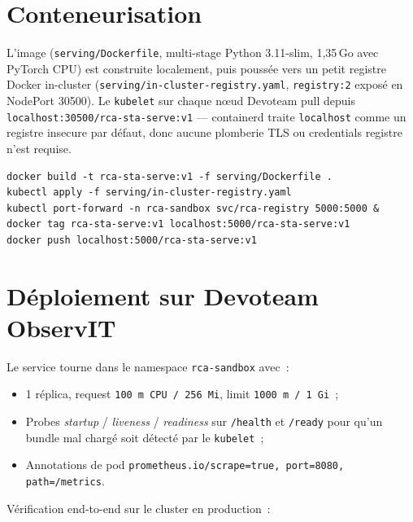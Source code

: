 \documentclass[a4paper,11pt,oneside]{report}
\begin{document}
\section{Conteneurisation}
\label{sec:container}

L'image (\texttt{serving/Dockerfile}, multi-stage Python 3.11-slim, 1{,}35\,Go avec PyTorch CPU) est construite localement, puis pouss\'ee vers un petit registre Docker in-cluster (\texttt{serving/in-cluster-registry.yaml}, \texttt{registry:2} expos\'e en NodePort 30500). Le \texttt{kubelet} sur chaque nœud Devoteam pull depuis \texttt{localhost:30500/rca-sta-serve:v1} --- containerd traite \texttt{localhost} comme un registre insecure par d\'efaut, donc aucune plomberie TLS ou credentials registre n'est requise.

\begin{lstlisting}[style=shell,caption={Commandes de build et push vers le registre in-cluster.}]
docker build -t rca-sta-serve:v1 -f serving/Dockerfile .
kubectl apply -f serving/in-cluster-registry.yaml
kubectl port-forward -n rca-sandbox svc/rca-registry 5000:5000 &
docker tag rca-sta-serve:v1 localhost:5000/rca-sta-serve:v1
docker push localhost:5000/rca-sta-serve:v1
\end{lstlisting}

\section{D\'eploiement sur Devoteam ObservIT}
\label{sec:k8s-deploy}

Le service tourne dans le namespace \texttt{rca-sandbox} avec~:
\begin{itemize}
  \item 1 r\'eplica, request \texttt{100\,m CPU / 256\,Mi}, limit \texttt{1000\,m / 1\,Gi}~;
  \item Probes \emph{startup} / \emph{liveness} / \emph{readiness} sur \texttt{/health} et \texttt{/ready} pour qu'un bundle mal charg\'e soit d\'etect\'e par le \texttt{kubelet}~;
  \item Annotations de pod \texttt{prometheus.io/scrape=true, port=8080, path=/metrics}.
\end{itemize}

V\'erification end-to-end sur le cluster en production~:
\end{document}
